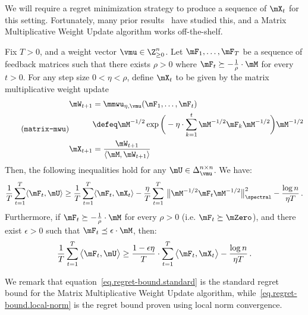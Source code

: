 \documentclass[letterpaper]{article}
\begin{document}
We will require a regret minimization strategy to produce a sequence of $\mX_t$ for this setting. Fortunately, many prior results~\cite{arora2007combinatorial, allen2015spectral, hazan2012near, kale2007efficient, LorenzosThesis, orecchia2012balanced_separator} have studied this, and a Matrix Multiplicative Weight Update algorithm works off-the-shelf.

\begin{theorem}
\label{thm.regret-bound}
Fix $T > 0$, and a weight vector $\vmu \in \Z_{\geq 0}^n$. Let $\mF_1, \ldots, \mF_T$ be a sequence of feedback matrices such that there exists $\rho > 0$ where $\mF_{t} \succeq - \frac{1}{\rho} \cdot \mM$ for every $t > 0$. For any step size $0 < \eta < \rho$, define $\mX_{t}$ to be given by the matrix multiplicative weight update
\begin{equation*}
\stepcounter{equation}
\tag{\texttt{matrix-mwu}}
\label{eq.mmwu}
\begin{aligned}
\mW_{t+1} &= \mmwu_{\eta, \vmu}( \mF_1, \ldots, \mF_t ) \\
&\defeq \mM^{-1/2} \exp \bigg( - \eta \cdot \sum_{k=1}^{t} \mM^{-1/2} \mF_k \mM^{-1/2} \bigg) \mM^{-1/2} \\
\mX_{t+1} &= \frac{\mW_{t+1}}{\langle \mM, \mW_{t+1} \rangle}
\end{aligned}
\end{equation*}
Then, the following inequalities hold for any $\mU \in \Delta^{n \times n}_{\vmu}$. We have:
\begin{equation}
\label{eq.regret-bound.standard}
\frac{1}{T} \sum_{t=1}^T \langle \mF_t, \mU \rangle
\geq \frac{1}{T} \sum_{t=1}^T \langle \mF_t, \mX_t \rangle - \frac{\eta}{T} \sum_{t=1}^T \, \big\lVert \mM^{-1/2} \mF_t \mM^{-1/2} \big\rVert_{\spectral}^2 - \frac{\log n}{\eta T} \, .
\end{equation}
Furthermore, if $\mF_{t} \succeq - \frac{1}{\rho} \cdot \mM$ for every $\rho > 0$ (i.e. $\mF_t \succeq \mZero$), and there exist $\epsilon > 0$ such that $\mF_t \preceq \epsilon \cdot \mM$, then:
\begin{equation}
\label{eq.regret-bound.local-norm}
\frac{1}{T} \sum_{t=1}^T \big\langle \mF_t, \mU \big\rangle
\geq \frac{1 - \epsilon \eta}{T} \cdot \sum_{t=1}^T \big\langle \mF_t, \mX_t \big\rangle - \frac{\log n}{\eta T} \, .
\end{equation}
\end{theorem}

\noindent
We remark that equation~\eqref{eq.regret-bound.standard} is the standard regret bound for the Matrix Multiplicative Weight Update algorithm, while~\eqref{eq.regret-bound.local-norm} is the regret bound proven using local norm convergence.
 
\end{document}
